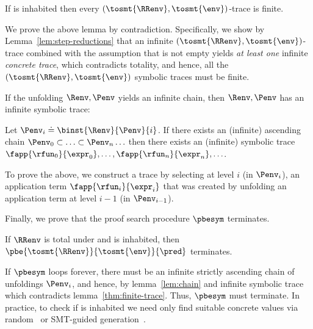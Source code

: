 \begin{theorem}\label{thm:finite-trace}
If %
   \env is inhabited
then every $(\tosmt{\RRenv},\tosmt{\env})$-trace is finite.
\end{theorem}

We prove the above lemma by contradiction.
Specifically, we show by Lemma~\ref{lem:step-reductions} that an infinite
$(\tosmt{\RRenv},\tosmt{\env})$-trace
combined with the assumption that \embed{\env} is not empty
yields \textit{at least one}
infinite \emph{concrete trace}, which
contradicts totality, and hence, all the
$(\tosmt{\RRenv},\tosmt{\env})$ symbolic traces
must be finite.

%
If the unfolding $\Renv, \Penv$ yields
an infinite chain, then $\Renv, \Penv$
has an infinite symbolic trace:

\begin{lemma}  \label{lem:chain}
Let $\Penv_i \doteq \binst{\Renv}{\Penv}{i}$.
If there exists an (infinite) ascending chain
$\Penv_0 \subset \ldots \subset \Penv_n \ldots$
then there exists an (infinite) symbolic trace
$\fapp{\rfun_0}{\expr_0},\ldots,\fapp{\rfun_n}{\expr_n},\ldots$.
\end{lemma}

To prove the above,
we construct a trace
by selecting at level $i$
(\ie in $\Penv_i$),
an application term
$\fapp{\rfun_i}{\expr_i}$
that was created by
unfolding an application
term at level $i-1$
(\ie in $\Penv_{i-1}$).

%
Finally, we prove that the proof search
procedure $\pbesym$ terminates.

\begin{theorem} \label{thm:termination}
  If $\RRenv$ is total under \env and \env is inhabited,
  then $\pbe{\tosmt{\RRenv}}{\tosmt{\env}}{\pred}$ terminates.
\end{theorem}

If $\pbesym$ loops forever,
there must be an infinite
strictly ascending chain of
unfoldings $\Penv_i$, and
hence, by lemma~\ref{lem:chain}
and infinite symbolic trace
which contradicts
lemma~\ref{thm:finite-trace}.
%
Thus, $\pbesym$ must terminate.
%
In practice, to check if \env is inhabited
we need only find suitable concrete values
via random~\cite{Claessen00} or SMT-guided
generation~\cite{Seidel15}.
